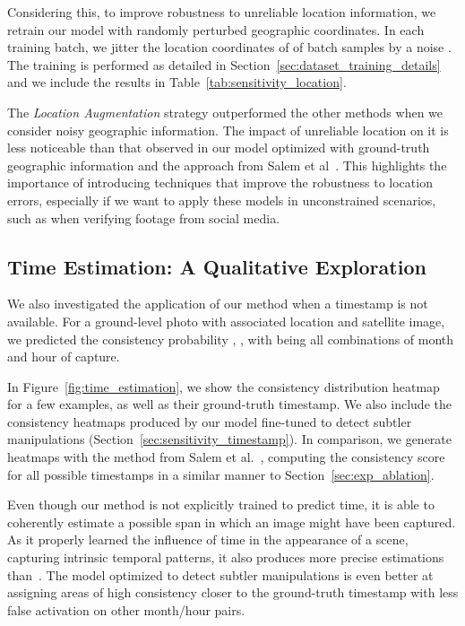 \documentclass[journal]{IEEEtran}
\begin{document}
        Considering this, to improve robustness to unreliable location information, we retrain our model with randomly perturbed geographic coordinates. In each training batch, we jitter the location coordinates of  of batch samples by a noise . The training is performed as detailed in Section~\ref{sec:dataset_training_details} and we include the results in Table~\ref{tab:sensitivity_location}.
        
        The \textit{Location Augmentation} strategy outperformed the other methods when we consider noisy geographic information. The impact of unreliable location on it is less noticeable than that observed in our model optimized with ground-truth geographic information and the approach from Salem et al~\cite{salem2020learning}. This highlights the importance of introducing techniques that improve the robustness to location errors, especially if we want to apply these models in unconstrained scenarios, such as when verifying footage from social media. 


        
        
    
    \subsection{Time Estimation: A Qualitative Exploration}\label{sec:time_estimation}
        We also investigated the application of our method when a timestamp is not available. For a ground-level photo with associated location and satellite image, we predicted the consistency probability ,  , with  being all combinations of month and hour of capture. 
        
        In Figure~\ref{fig:time_estimation}, we show the consistency distribution heatmap for a few examples, as well as their ground-truth timestamp. We also include the consistency heatmaps produced by our model fine-tuned to detect subtler manipulations (Section~\ref{sec:sensitivity_timestamp}). In comparison, we generate heatmaps with the method from Salem et al.~\cite{salem2020learning}, computing the consistency score for all possible timestamps in a similar manner to Section~\ref{sec:exp_ablation}. 
        
        Even though our method is not explicitly trained to predict time, it is able to coherently estimate a possible span in which an image might have been captured. As it properly learned the influence of time in the appearance of a scene, capturing intrinsic temporal patterns, it also produces more precise estimations than~\cite{salem2020learning}. The model optimized to detect subtler manipulations is even better at assigning areas of high consistency closer to the ground-truth timestamp with less false activation on other month/hour pairs.
        
\end{document}
